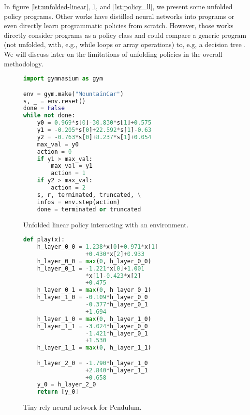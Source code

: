 In figure \ref{lst:unfolded-linear}, \ref{lst:generic-linear}, and \ref{lst:policy_ll}, we present some unfolded policy programs.
Other works have distilled neural networks into programs \cite{PIRL} or even directly learn programmatic policies \cite{pirl2} from scratch.
However, those works directly consider programs as a policy class and could compare a generic program (not unfolded, with, e.g., while loops or array operations) to, e.g, a decision tree \cite{leap}.
We will discuss later on the limitations of unfolding policies in the overall methodology.

\begin{figure}
\centering
\begin{minipage}{0.47\textwidth}
\begin{lstlisting}[language=Python,style=mystyle]
import gymnasium as gym

env = gym.make("MountainCar")
s, _ = env.reset()
done = False
while not done:
    y0 = 0.969*s[0]-30.830*s[1]+0.575
    y1 = -0.205*s[0]+22.592*s[1]-0.63
    y2 = -0.763*s[0]+8.237*s[1]+0.054
    max_val = y0
    action = 0
    if y1 > max_val:
        max_val = y1
        action = 1
    if y2 > max_val:
        action = 2
    s, r, terminated, truncated, \
    infos = env.step(action)
    done = terminated or truncated
\end{lstlisting}
\caption{Unfolded linear policy interacting with an environment.}\label{lst:unfolded-linear}
\end{minipage}
\hfill
\begin{minipage}{0.47\textwidth}
\begin{lstlisting}[language=Python,style=mystyle]
def play(x):
    h_layer_0_0 = 1.238*x[0]+0.971*x[1]
                  +0.430*x[2]+0.933
    h_layer_0_0 = max(0, h_layer_0_0)
    h_layer_0_1 = -1.221*x[0]+1.001
                  *x[1]-0.423*x[2]
                  +0.475
    h_layer_0_1 = max(0, h_layer_0_1)
    h_layer_1_0 = -0.109*h_layer_0_0
                  -0.377*h_layer_0_1
                  +1.694
    h_layer_1_0 = max(0, h_layer_1_0)
    h_layer_1_1 = -3.024*h_layer_0_0
                  -1.421*h_layer_0_1
                  +1.530
    h_layer_1_1 = max(0, h_layer_1_1)

    h_layer_2_0 = -1.790*h_layer_1_0
                  +2.840*h_layer_1_1
                  +0.658
    y_0 = h_layer_2_0
    return [y_0]
\end{lstlisting}
\caption{Tiny rely neural network for Pendulum.}\label{lst:generic-linear}
\end{minipage}
\end{figure}